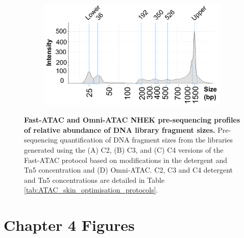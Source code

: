 \begin{figure}[htbp]
\begin{subfigure}{0.60\textwidth}
\caption{\textbf{}} %
\end{subfigure}
\begin{subfigure}{0.60\textwidth}
\centering
\includegraphics[width=\textwidth]{./Appendix/pdfs/Chapter3/Omni_ATAC_NHEK_Rep1_tapestation}
\caption{\textbf{}} %
\end{subfigure}
\hfill
\caption[Fast-ATAC and Omni-ATAC NHEK pre-sequencing profiles of relative abundance of DNA library fragment sizes.]{\textbf{Fast-ATAC and Omni-ATAC NHEK pre-sequencing profiles of relative abundance of DNA library fragment sizes.} Pre-sequencing quantification of DNA fragment sizes from the libraries generated  using the (A) C2, (B) C3, and (C) C4 versions of the Fast-ATAC protocol based on modifications in the detergent and Tn5 concentration and (D) Omni-ATAC. C2, C3 and C4 detergent and Tn5 concentrations are detailed in Table \ref{tab:ATAC_skin_optimisation_protocols}.}
\label{figure:NHEK_tapestation}
\end{figure}


\clearpage


\section{Chapter 4 Figures}

